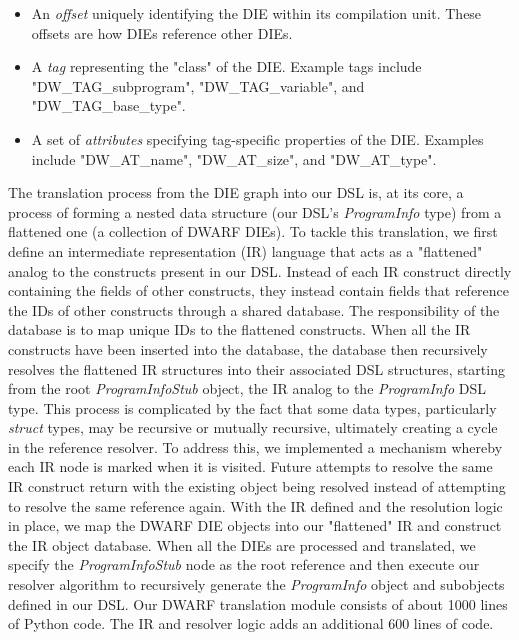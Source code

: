 \documentclass[conference]{IEEEtran}
\begin{document}
\begin{itemize}
    \item An \emph{offset} uniquely identifying the DIE within its compilation unit. These offsets are how DIEs reference other DIEs.
    \item A \emph{tag} representing the "class" of the DIE. Example tags include "DW\_TAG\_subprogram", "DW\_TAG\_variable", and "DW\_TAG\_base\_type".
    \item A set of \emph{attributes} specifying tag-specific properties of the DIE. Examples include "DW\_AT\_name", "DW\_AT\_size", and "DW\_AT\_type".
\end{itemize}

The translation process from the DIE graph into our DSL is, at its core, a process of forming a nested data structure (our DSL's \emph{ProgramInfo} type) from a flattened one (a collection of DWARF DIEs). To tackle this translation, we first define an intermediate representation (IR) language that acts as a "flattened" analog to the constructs present in our DSL. Instead of each IR construct directly containing the fields of other constructs, they instead contain fields that reference the IDs of other constructs through a shared database. The responsibility of the database is to map unique IDs to the flattened constructs. When all the IR constructs have been inserted into the database, the database then recursively resolves the flattened IR structures into their associated DSL structures, starting from the root \emph{ProgramInfoStub} object, the IR analog to the \emph{ProgramInfo} DSL type. This process is complicated by the fact that some data types, particularly \emph{struct} types, may be recursive or mutually recursive, ultimately creating a cycle in the reference resolver. To address this, we implemented a mechanism whereby each IR node is marked when it is visited. Future attempts to resolve the same IR construct return with the existing object being resolved instead of attempting to resolve the same reference again. With the IR defined and the resolution logic in place, we map the DWARF DIE objects into our "flattened" IR and construct the IR object database. When all the DIEs are processed and translated, we specify the \emph{ProgramInfoStub} node as the root reference and then execute our resolver algorithm to recursively generate the \emph{ProgramInfo} object and subobjects defined in our DSL. Our DWARF translation module consists of about 1000 lines of Python code. The IR and resolver logic adds an additional 600 lines of code.
\end{document}
